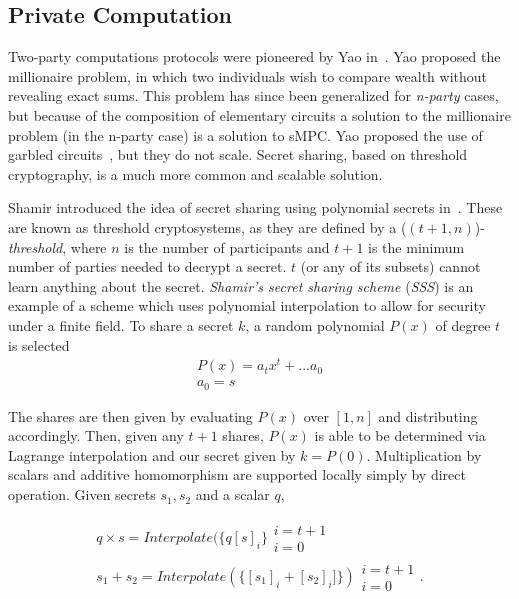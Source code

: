 \documentclass[journal,11pt]{IEEEtran}
\begin{document}
\subsection{Private Computation}
\par Two-party computations protocols were pioneered by Yao in~\cite{Yao1982ProtocolsComputations}. Yao proposed the millionaire problem, in which two individuals wish to compare wealth without revealing exact sums. This problem has since been generalized for \textit{n-party} cases, but because of the composition of elementary circuits a solution to the millionaire problem (in the n-party case) is a solution to sMPC. Yao proposed the use of garbled circuits~\cite{Huang2011FasterCircuits.}, but they do not scale. Secret sharing, based on threshold cryptography, is a much more common and scalable solution.

\par Shamir introduced the idea of secret sharing using polynomial secrets in~\cite{Shamir1979HowSecret}. These are known as threshold cryptosystems, as they are defined by a ($(t+1,n)$)-\textit{threshold}, where $n$ is the number of participants and $t+1$ is the minimum number of parties needed to decrypt a secret. $t$ (or any of its subsets) cannot learn anything about the secret. \textit{Shamir's secret sharing scheme} (\textit{SSS}) is an example of a scheme which uses polynomial interpolation to allow for security under a finite field. To share a secret $k$, a random polynomial $P(x)$ of degree $t$ is selected 
\begin{gather}
P(x) = a_{t}x^t + ... a_0 \\
a_0 = s
\end{gather}

\par The shares are then given by evaluating $P(x)$ over $[1,n]$ and distributing accordingly. Then, given any $t+1$ shares, $P(x)$ is able to be determined via Lagrange interpolation and our secret given by $k = P(0)$. Multiplication by scalars and additive homomorphism are supported locally simply by direct operation. Given secrets $s_1,s_2$ and a scalar $q$,

\begin{gather}
q \times s = Interpolate(\{q[s]_i\}\substack{i=t+1\\i=0} \\
s_1 + s_2 = Interpolate(\{[s_1]_i + [s_2]_i]\})\substack{i=t+1\\i=0}.
\end{gather}
\end{document}
